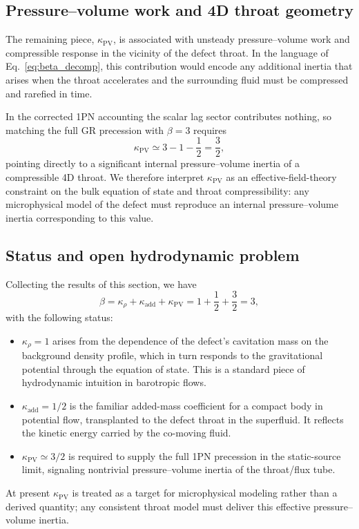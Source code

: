 \documentclass[11pt]{article}
\begin{document}
\subsection{Pressure--volume work and 4D throat geometry}
\label{sec:hydro_kappa_PV}

The remaining piece, $\kappa_{\mathrm{PV}}$, is associated with unsteady pressure--volume work and compressible response in the vicinity of the defect throat. In the language of Eq.~\eqref{eq:beta_decomp}, this contribution would encode any additional inertia that arises when the throat accelerates and the surrounding fluid must be compressed and rarefied in time.

In the corrected 1PN accounting the scalar lag sector contributes nothing, so matching the full GR precession with $\beta = 3$ requires
\begin{equation}
  \kappa_{\mathrm{PV}}
  \simeq 3 - 1 - \frac{1}{2}
  = \frac{3}{2},
\end{equation}
pointing directly to a significant internal pressure--volume inertia of a compressible 4D throat. We therefore interpret $\kappa_{\mathrm{PV}}$ as an effective-field-theory constraint on the bulk equation of state and throat compressibility: any microphysical model of the defect must reproduce an internal pressure--volume inertia corresponding to this value.

\subsection{Status and open hydrodynamic problem}
\label{sec:hydro_status}

Collecting the results of this section, we have
\begin{equation}
  \beta = \kappa_\rho + \kappa_{\mathrm{add}} + \kappa_{\mathrm{PV}}
        = 1 + \frac{1}{2} + \frac{3}{2}
        = 3,
\end{equation}
with the following status:
\begin{itemize}
  \item $\kappa_\rho = 1$ arises from the dependence of the defect's cavitation mass on the background density profile, which in turn responds to the gravitational potential through the equation of state. This is a standard piece of hydrodynamic intuition in barotropic flows.
  \item $\kappa_{\mathrm{add}} = 1/2$ is the familiar added-mass coefficient for a compact body in potential flow, transplanted to the defect throat in the superfluid. It reflects the kinetic energy carried by the co-moving fluid.
  \item $\kappa_{\mathrm{PV}} \simeq 3/2$ is required to supply the full 1PN precession in the static-source limit, signaling nontrivial pressure--volume inertia of the throat/flux tube.
\end{itemize}
At present $\kappa_{\mathrm{PV}}$ is treated as a target for microphysical modeling rather than a derived quantity; any consistent throat model must deliver this effective pressure--volume inertia.
\end{document}
